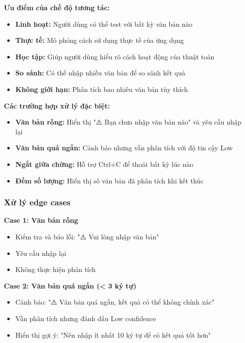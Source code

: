 \textbf{Ưu điểm của chế độ tương tác:}
\begin{itemize}
    \item \textbf{Linh hoạt:} Người dùng có thể test với bất kỳ văn bản nào
    \item \textbf{Thực tế:} Mô phỏng cách sử dụng thực tế của ứng dụng
    \item \textbf{Học tập:} Giúp người dùng hiểu rõ cách hoạt động của thuật toán
    \item \textbf{So sánh:} Có thể nhập nhiều văn bản để so sánh kết quả
    \item \textbf{Không giới hạn:} Phân tích bao nhiêu văn bản tùy thích
\end{itemize}

\textbf{Các trường hợp xử lý đặc biệt:}
\begin{itemize}
    \item \textbf{Văn bản rỗng:} Hiển thị "⚠️ Bạn chưa nhập văn bản nào" và yêu cầu nhập lại
    \item \textbf{Văn bản quá ngắn:} Cảnh báo nhưng vẫn phân tích với độ tin cậy Low
    \item \textbf{Ngắt giữa chừng:} Hỗ trợ Ctrl+C để thoát bất kỳ lúc nào
    \item \textbf{Đếm số lượng:} Hiển thị số văn bản đã phân tích khi kết thúc
\end{itemize}

\subsubsection{Xử lý edge cases}

\textbf{Case 1: Văn bản rỗng}
\begin{itemize}
    \item Kiểm tra và báo lỗi: "⚠️ Vui lòng nhập văn bản"
    \item Yêu cầu nhập lại
    \item Không thực hiện phân tích
\end{itemize}

\textbf{Case 2: Văn bản quá ngắn (< 3 ký tự)}
\begin{itemize}
    \item Cảnh báo: "⚠️ Văn bản quá ngắn, kết quả có thể không chính xác"
    \item Vẫn phân tích nhưng đánh dấu Low confidence
    \item Hiển thị gợi ý: "Nên nhập ít nhất 10 ký tự để có kết quả tốt hơn"
\end{itemize}

